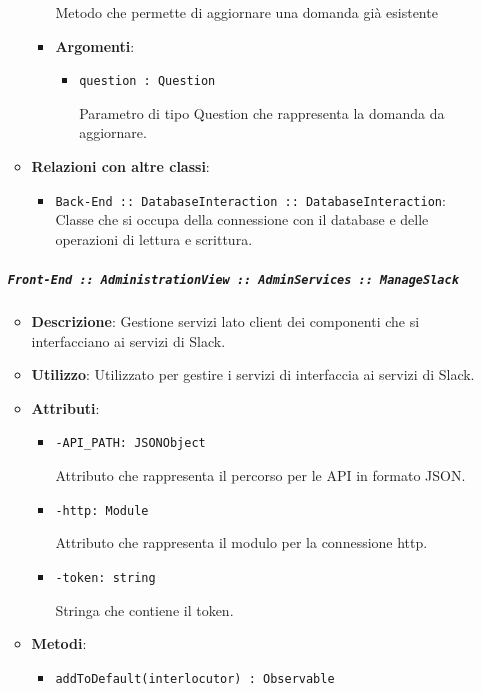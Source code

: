 \documentclass[../DefinizioneDiProdotto.tex]{subfiles}
\begin{document}
\begin{itemize}
\begin{itemize}
\begin{itemize}
	 Metodo che permette di aggiornare una domanda già esistente

	\item \textbf{Argomenti}:
	\begin{itemize}
	\item \texttt{question : Question}\

	 Parametro di tipo Question che rappresenta la domanda da aggiornare.
	\end{itemize}
	\end{itemize}\vspace{0.5em}
	\item \textbf{Relazioni con altre classi}:
	\begin{itemize}
	\item \texttt{Back-End :: DatabaseInteraction :: DatabaseInteraction}: Classe che si occupa della connessione con il database e delle operazioni di lettura e scrittura.
	\end{itemize}
	\end{itemize}\subparagraph{\texttt{Front-End :: AdministrationView :: AdminServices :: ManageSlack}}
	\begin{itemize}\item \textbf{Descrizione}: Gestione servizi lato client dei componenti che si interfacciano ai servizi di Slack.
	\item \textbf{Utilizzo}: Utilizzato per gestire i servizi di interfaccia ai servizi di Slack.
	\item \textbf{Attributi}:
	\begin{itemize}
	\item \texttt{-API\_PATH: JSONObject}\

	 Attributo che rappresenta il percorso per le API in formato JSON.
	\end{itemize}
	\begin{itemize}
	\item \texttt{-http: Module}\

	 Attributo che rappresenta il modulo per la connessione http.
	\end{itemize}
	\begin{itemize}
	\item \texttt{-token: string}\

	 Stringa che contiene il token.
	\end{itemize}
	\item \textbf{Metodi}:
	\begin{itemize}
	\item \texttt{addToDefault(interlocutor) : Observable}\


\end{itemize}
\end{itemize}
\end{itemize}
\end{document}
